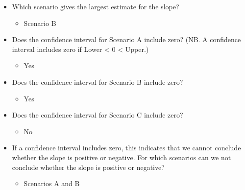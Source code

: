\documentclass[
  12pt,
  letterpaper,
  DIV=11,
  numbers=noendperiod]{scrartcl}
\providecommand{\tightlist}{%
  \setlength{\itemsep}{0pt}\setlength{\parskip}{0pt}}\usepackage{longtable,booktabs,array}
\begin{document}
\begin{tcolorbox}[enhanced jigsaw, arc=.35mm, coltitle=black, leftrule=.75mm, bottomtitle=1mm, colback=white, rightrule=.15mm, colframe=quarto-callout-note-color-frame, toprule=.15mm, left=2mm, opacitybacktitle=0.6, toptitle=1mm, title={Questions for the Class}, colbacktitle=quarto-callout-note-color!10!white, breakable, titlerule=0mm, opacityback=0, bottomrule=.15mm]

\begin{itemize}
\tightlist
\item
  Which scenario gives the largest estimate for the slope?

  \begin{itemize}
  \tightlist
  \item
    Scenario B
  \end{itemize}
\item
  Does the confidence interval for Scenario A include zero? (NB. A
  confidence interval includes zero if Lower \textless{} 0 \textless{}
  Upper.)

  \begin{itemize}
  \tightlist
  \item
    Yes
  \end{itemize}
\item
  Does the confidence interval for Scenario B include zero?

  \begin{itemize}
  \tightlist
  \item
    Yes
  \end{itemize}
\item
  Does the confidence interval for Scenario C include zero?

  \begin{itemize}
  \tightlist
  \item
    No
  \end{itemize}
\item
  If a confidence interval includes zero, this indicates that we cannot
  conclude whether the slope is positive or negative. For which
  scenarios can we not conclude whether the slope is positive or
  negative?

  \begin{itemize}
  \tightlist
  \item
    Scenarios A and B
  \end{itemize}
\end{itemize}

\end{tcolorbox}
\end{document}
